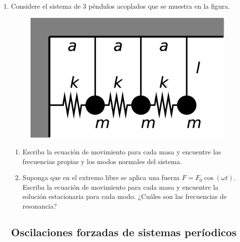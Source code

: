 \documentclass[11pt,spanish,a4paper]{article}
\begin{document}
\begin{enumerate}
\item Considere el sistema de 3 péndulos acoplados que se muestra en la
figura.
\begin{figure}[H]
\centering{}\includegraphics[clip,scale=0.25]{ej1-14}
\end{figure}

\begin{enumerate}
\item Escriba la ecuación de movimiento para cada masa y encuentre las frecuencias
propias y los modos normales del sistema. 
\item Suponga que en el extremo libre se aplica una fuerza $F=F_{0}\cos(\omega t)$.
Escriba la ecuación de movimiento para cada masa y encuentre la solución
estacionaria para cada modo. ¿Cuáles son las frecuencias de resonancia?
\end{enumerate}



\subsection*{Oscilaciones forzadas de sistemas períodicos}



\end{enumerate}
\end{document}
